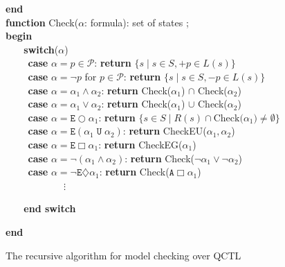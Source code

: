 \documentclass{entcs}
\begin{document}
\begin{figure}[htbp]
{{{\textbf{end}\\


\textbf{function} Check($\alpha$: formula):
set of states ;\\
\textbf{begin} \\
\noindent$\mbox{  }\ \ \ \ $ \textbf{switch}($\alpha$)\\
 $\mbox{}\ \ \ \ \ \ \ \ \ $ \textbf{case} $\alpha=p\in\mathcal{P}$: \textbf{return} $\{s\;|\;s\in S,+p\in L(s)\}$\\
 $\mbox{}\ \ \ \ \ \ \ \ \ $ \textbf{case} $\alpha=\neg p$ for $p\in\mathcal{P}$:
\textbf{ return }$\{s\;|\;s\in S,-p\in L(s)\}$\\
 $\mbox{}\ \ \ \ \ \ \ \ \ $ \textbf{case} $\alpha=\alpha_1\wedge\alpha_2$:
 \textbf{return}
 Check($\alpha_1$) $\cap$ Check($\alpha_2$)\\
 $\mbox{}\ \ \ \ \ \ \ \ \ $ \textbf{case} $\alpha=\alpha_1\vee\alpha_2$:
 \textbf{return}
 Check($\alpha_1$) $\cup$ Check($\alpha_2$)\\
 $\mbox{}\ \ \ \ \ \ \ \ \ $ \textbf{case} $\alpha=\texttt{E}\bigcirc\alpha_1$:
\textbf{ return} $\{s\in
 S\;|\;R(s)\cap\mbox{Check($\alpha_1$)}\neq\emptyset\}$\\
 $\mbox{}\ \ \ \ \ \ \ \ \ $ \textbf{case}
 $\alpha=\texttt{E}(\alpha_1\;\texttt{U}\;\alpha_2)$:
 \textbf{return}
 CheckEU($\alpha_1,\alpha_2$)\\
 $\mbox{}\ \ \ \ \ \ \ \ \ $ \textbf{case} $\alpha=\texttt{E}\Box\alpha_1$:
 \textbf{return}
 CheckEG($\alpha_1$)\\
 $\mbox{}\ \ \ \ \ \ \ \ \ $ \textbf{case}
 $\alpha=\neg(\alpha_1\wedge\alpha_2)$: \textbf{return}
 Check($\neg\alpha_1\vee\neg\alpha_2$)\\
$\mbox{}\ \ \ \ \ \ \ \ \ $ \textbf{case}
$\alpha=\neg\texttt{E}\diamondsuit\alpha_1$: \textbf{return}
Check($\texttt{A}\Box\alpha_1$)\\
$\mbox{}\qquad \qquad \qquad\vdots$

\noindent$\mbox{  }\ \ \ \ $ \textbf{end switch}

\textbf{end}
 }}}
 \caption{The recursive algorithm for model checking over QCTL}
 \label{fig:ALG}
\end{figure}
\end{document}
